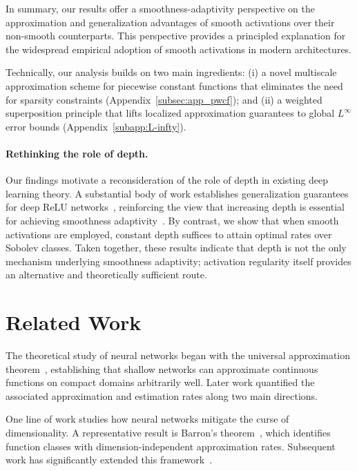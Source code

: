 \documentclass[11pt]{article}
\begin{document}
In summary, our results offer a smoothness-adaptivity perspective on the approximation and generalization advantages of smooth activations over their non-smooth counterparts. This perspective provides a principled explanation for the widespread empirical adoption of smooth activations in modern architectures.

Technically, our analysis builds on two main ingredients: 
(i) a novel multiscale approximation scheme for piecewise constant functions that eliminates the need for sparsity constraints (Appendix~\ref{subsec:app_pwcf}); and 
(ii) a weighted superposition principle that lifts localized approximation guarantees to global $L^\infty$ error bounds (Appendix~\ref{subapp:L-infty}).



\paragraph*{Rethinking the role of depth.}
Our findings motivate a reconsideration of the role of depth in existing deep learning theory.
A substantial body of work establishes  generalization guarantees for deep ReLU networks~\citep{yarotsky2017error,liang2017deep,schmidt2020nonparametric,kohler2021rate,suzukiadaptivity}, reinforcing the view that increasing depth is essential for achieving smoothness adaptivity~\citep{telgarsky2016benefits,vardi2020neural}.
By contrast, we show that when smooth activations are employed, constant depth suffices to attain optimal rates over Sobolev classes.
Taken together, these results indicate that depth is not the only mechanism underlying smoothness adaptivity; activation regularity itself provides an alternative and theoretically sufficient route.

\section{Related Work}
The theoretical study of neural networks began with the universal approximation theorem~\citep{cybenko1989approximation,hornik1989multilayer,hornik1991approximation}, establishing that shallow networks can approximate continuous functions on compact domains arbitrarily well. Later work quantified the associated approximation and estimation rates along two main directions.

One line of work studies how neural networks mitigate the curse of dimensionality. A representative result is Barron’s theorem~\citep{barron1993universal}, which identifies function classes with dimension-independent approximation rates. Subsequent work has significantly extended this framework~\citep{devore1998nonlinear,kurkova2002bounds,bach2017breaking,ma2018priori,klusowski2018approximation,weinan2019barron,siegel2020approximation,wu2022spectral,caragea2023neural,siegel2024sharp,chen2025duality}.
\end{document}
